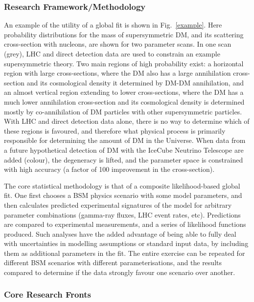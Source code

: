\documentclass[11pt,oneside,twocolumn,a4paper]{article}
\begin{document}
\subsubsection*{Research Framework/Methodology}

An example of the utility of a global fit is shown in Fig.~\ref{example}.  Here probability distributions for the mass of supersymmetric DM, and its scattering cross-section with nucleons, are shown for two parameter scans.  In one scan (grey), LHC and direct detection data are used to constrain an example supersymmetric theory.  Two main regions of high probability exist: a horizontal region with large cross-sections, where the DM also has a large annihilation cross-section and its cosmological density it determined by DM-DM annihilation, and an almost vertical region extending to lower cross-sections, where the DM has a much lower annihilation cross-section and its cosmological density is determined mostly by co-annihilation of DM particles with other supersymmetric particles.  With LHC and direct detection data alone, there is no way to determine which of these regions is favoured, and therefore what physical process is primarily responsible for determining the amount of DM in the Universe.  When data from a future hypothetical detection of DM with the IceCube Neutrino Telescope are added (colour), the degeneracy is lifted, and the parameter space is constrained with high accuracy (a factor of 100 improvement in the cross-section).

The core statistical methodology is that of a composite likelihood-based global fit.  One first chooses a BSM physics scenario with some model parameters, and then calculates predicted experimental signatures of the model for arbitrary parameter combinations (gamma-ray fluxes, LHC event rates, etc).  Predictions are compared to experimental measurements, and a series of likelihood functions produced.  Such analyses have the added advantage of being able to fully deal with uncertainties in modelling assumptions or standard input data, by including them as additional parameters in the fit.  The entire exercise can be repeated for different BSM scenarios with different parameterisations, and the results compared to determine if the data strongly favour one scenario over another.

\subsubsection*{Core Research Fronts}
\end{document}
